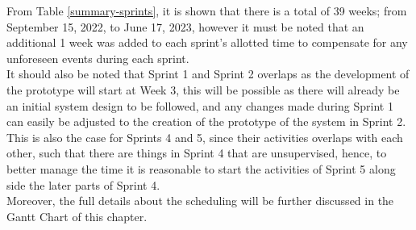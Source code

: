 From Table \ref{summary-sprints}, it is 
shown that there is a total of 39 weeks; from September 15, 2022, 
to June 17, 2023, however it must be noted that an additional 1 week 
was added to each sprint’s allotted time to compensate for any unforeseen 
events during each sprint.
\hfill \\

It should also be noted that Sprint 1 and Sprint 2 overlaps as 
the development of the prototype will start at Week 3, this will 
be possible as there will already be an initial system design to be followed, 
and any changes made during Sprint 1 can easily be adjusted to the creation of 
the prototype of the system in Sprint 2. This is also the case for Sprints 4 and 5, 
since their activities overlaps with each other, such that there are things in 
Sprint 4 that are unsupervised, hence, to better manage the time it is reasonable 
to start the activities of Sprint 5 along side the later parts of Sprint 4.
\hfill \\

Moreover, the full details about the scheduling will be 
further discussed in the Gantt Chart of this chapter.